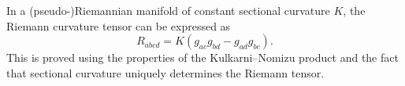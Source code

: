 \documentclass[../geometry_main.tex]{subfiles}
\begin{document}
\begin{mytheorem}

\end{mytheorem}


\begin{mytheorem}
In a (pseudo-)Riemannian manifold of constant sectional curvature \(K\), the Riemann curvature tensor can be expressed as
\[
    R_{abcd} = K (g_{ac} g_{bd} - g_{ad} g_{bc}).
\]
This is proved using the properties of the Kulkarni--Nomizu product and the fact that sectional curvature uniquely determines the Riemann tensor.
%
\end{mytheorem}
\end{document}

